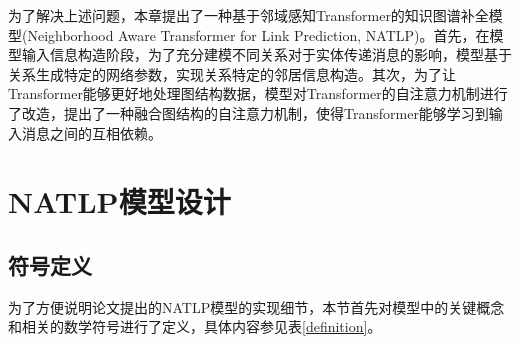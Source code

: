 为了解决上述问题，本章提出了一种基于邻域感知Transformer的知识图谱补全模型(Neighborhood Aware Transformer for Link Prediction, NATLP)。首先，在模型输入信息构造阶段，为了充分建模不同关系对于实体传递消息的影响，模型基于关系生成特定的网络参数，实现关系特定的邻居信息构造。其次，为了让Transformer能够更好地处理图结构数据，模型对Transformer的自注意力机制进行了改造，提出了一种融合图结构的自注意力机制，使得Transformer能够学习到输入消息之间的互相依赖。

\section{NATLP模型设计}

\subsection{符号定义}

为了方便说明论文提出的NATLP模型的实现细节，本节首先对模型中的关键概念和相关的数学符号进行了定义，具体内容参见表\ref{definition}。

\setlength{\tabcolsep}{20pt}

